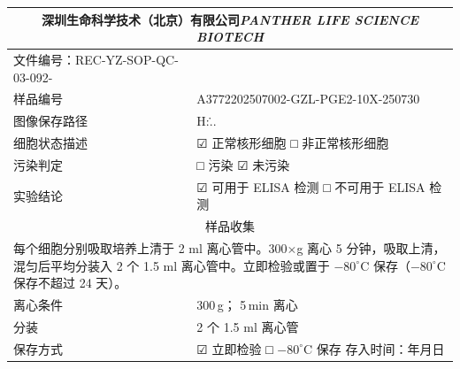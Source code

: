 \documentclass[UTF8,10pt,a4paper,fontset=fandol]{ctexart}
\newcommand{\fieldvalue}[1]{#1}
\newcommand{\handwritten}[1]{#1}
\begin{document}

\newpage

\begin{center}
\small
\begin{tabularx}{\textwidth}{|p{}|X|}
\hline
\multicolumn{2}{|c|}{深圳生命科学技术（北京）有限公司\quad \textit{PANTHER LIFE SCIENCE BIOTECH}}\\
\hline
文件编号：REC-YZ-SOP-QC-03-092- & \\
\hline
样品编号 &
\fieldvalue{A3772202507002-GZL-PGE2-10X-250730}\\
\hline
图像保存路径 &
\fieldvalue{\handwritten{H:\...}}\\
\hline
细胞状态描述 &
\fieldvalue{☑ 正常核形细胞 \quad □ 非正常核形细胞}\\
\hline
污染判定 &
\fieldvalue{□ 污染 \quad ☑ 未污染}\\
\hline
实验结论 &
\fieldvalue{☑ 可用于 ELISA 检测 \quad □ 不可用于 ELISA 检测}\\
\hline
\multicolumn{2}{|c|}{样品收集}\\
\hline
\multicolumn{2}{|p{\dimexpr\textwidth-2\tabcolsep-2\arrayrulewidth\relax}|}{
每个细胞分别吸取培养上清于 2 ml 离心管中。300$\times$g 离心 5 分钟，吸取上清，混匀后平均分装入 2 个 1.5 ml 离心管中。立即检验或置于 $-80^\circ$C 保存（$-80^\circ$C 保存不超过 24 天）。
}\\
\hline
离心条件 &
\fieldvalue{\handwritten{300}}\,g；%
\fieldvalue{\handwritten{5}}\,min 离心\\
\hline
分装 &
\fieldvalue{\handwritten{2}} 个 1.5 ml 离心管\\
\hline
保存方式 &
\fieldvalue{☑ 立即检验 \quad □ $-80^\circ$C 保存}\qquad
存入时间：\underline{\hspace{1.2cm}}年\underline{\hspace{1.2cm}}月\underline{\hspace{1.2cm}}日\\

\end{tabularx}
\end{center}
\end{document}
